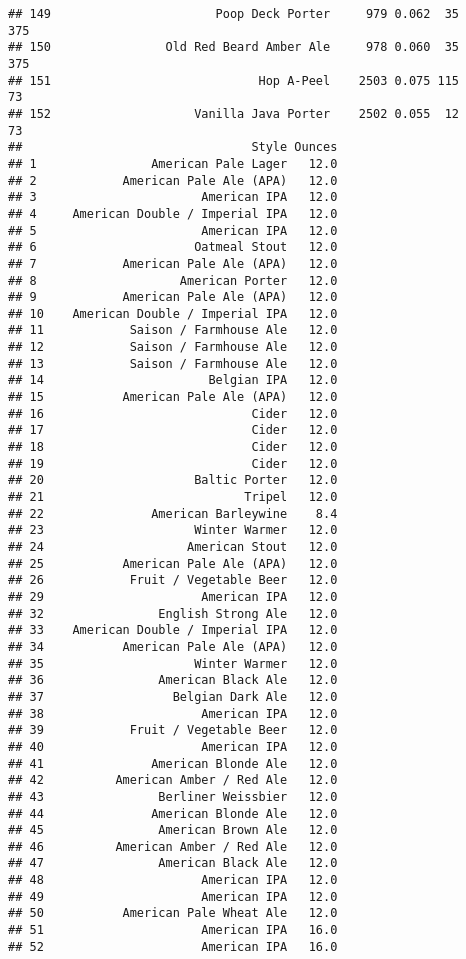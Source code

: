 \documentclass[
]{article}
\begin{document}
\begin{verbatim}
## 149                       Poop Deck Porter     979 0.062  35        375
## 150                Old Red Beard Amber Ale     978 0.060  35        375
## 151                             Hop A-Peel    2503 0.075 115         73
## 152                    Vanilla Java Porter    2502 0.055  12         73
##                                Style Ounces
## 1                American Pale Lager   12.0
## 2            American Pale Ale (APA)   12.0
## 3                       American IPA   12.0
## 4     American Double / Imperial IPA   12.0
## 5                       American IPA   12.0
## 6                      Oatmeal Stout   12.0
## 7            American Pale Ale (APA)   12.0
## 8                    American Porter   12.0
## 9            American Pale Ale (APA)   12.0
## 10    American Double / Imperial IPA   12.0
## 11            Saison / Farmhouse Ale   12.0
## 12            Saison / Farmhouse Ale   12.0
## 13            Saison / Farmhouse Ale   12.0
## 14                       Belgian IPA   12.0
## 15           American Pale Ale (APA)   12.0
## 16                             Cider   12.0
## 17                             Cider   12.0
## 18                             Cider   12.0
## 19                             Cider   12.0
## 20                     Baltic Porter   12.0
## 21                            Tripel   12.0
## 22               American Barleywine    8.4
## 23                     Winter Warmer   12.0
## 24                    American Stout   12.0
## 25           American Pale Ale (APA)   12.0
## 26            Fruit / Vegetable Beer   12.0
## 29                      American IPA   12.0
## 32                English Strong Ale   12.0
## 33    American Double / Imperial IPA   12.0
## 34           American Pale Ale (APA)   12.0
## 35                     Winter Warmer   12.0
## 36                American Black Ale   12.0
## 37                  Belgian Dark Ale   12.0
## 38                      American IPA   12.0
## 39            Fruit / Vegetable Beer   12.0
## 40                      American IPA   12.0
## 41               American Blonde Ale   12.0
## 42          American Amber / Red Ale   12.0
## 43                Berliner Weissbier   12.0
## 44               American Blonde Ale   12.0
## 45                American Brown Ale   12.0
## 46          American Amber / Red Ale   12.0
## 47                American Black Ale   12.0
## 48                      American IPA   12.0
## 49                      American IPA   12.0
## 50           American Pale Wheat Ale   12.0
## 51                      American IPA   16.0
## 52                      American IPA   16.0

\end{verbatim}
\end{document}
